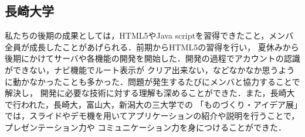 \subsection{長崎大学}
私たちの後期の成果としては，HTML5やJava scriptを習得できたこと，メンバ全員が成長したことがあげられる．前期からHTML5の習得を行い，
夏休みから後期にかけてサーバや各機能の開発を開始した．開発の過程でアカウントの認識ができない，ナビ機能でルート表示が
クリア出来ない，などなかなか思うように動かなかったことも多かった．問題が発生するたびにメンバと協力することで解決し，
開発に必要な技術に対する理解も深めることができた．また，長崎大で行われた，長崎大，富山大，新潟大の三大学での
「ものづくり・アイデア展」では，スライドやデモ機を用いてアプリケーションの紹介や説明を行うことで，プレゼンテーション力や
コミュニケーション力を身につけることができた．
